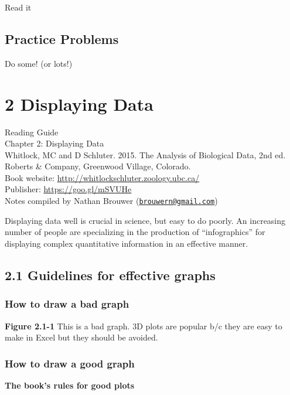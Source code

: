 \documentclass[]{book}
\theoremstyle{definition}
\theoremstyle{definition}
\theoremstyle{definition}
\theoremstyle{remark}
\begin{document}
Read it

\section{Practice Problems}\label{practice-problems}

Do some! (or lots!)

\chapter{2 Displaying Data}\label{displaying-data}

Reading Guide\\
Chapter 2: Displaying Data\\
Whitlock, MC and D Schluter. 2015. The Analysis of Biological Data, 2nd
ed. Roberts \& Company, Greenwood Village, Colorado.\\
Book website: \url{http://whitlockschluter.zoology.ubc.ca/}\\
Publisher: \url{https://goo.gl/mSVUHe}\\
Notes compiled by Nathan Brouwer
(\href{mailto:brouwern@gmail.com}{\nolinkurl{brouwern@gmail.com}})

Displaying data well is crucial in science, but easy to do poorly. An
increasing number of people are specializing in the production of
``infographics'' for displaying complex quantitative information in an
effective manner.

\section{2.1 Guidelines for effective
graphs}\label{guidelines-for-effective-graphs}

\subsection{How to draw a bad graph}\label{how-to-draw-a-bad-graph}

\textbf{Figure 2.1-1} This is a bad graph. 3D plots are popular b/c they
are easy to make in Excel but they should be avoided.

\subsection{How to draw a good graph}\label{how-to-draw-a-good-graph}

\textbf{The book's rules for good plots}
\end{document}

